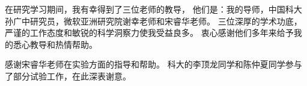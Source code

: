 \begin{acknowledgements}

在研究学习期间，我有幸得到了三位老师的教导，
他们是：我的导师，中国科大孙广中研究员，微软亚洲研究院谢幸老师和宋睿华老师。
三位深厚的学术功底，严谨的工作态度和敏锐的科学洞察力使我受益良多。
衷心感谢他们多年来给予我的悉心教导和热情帮助。

感谢宋睿华老师在实验方面的指导和帮助。
科大的李顶龙同学和陈仲夏同学参与了部分试验工作，在此深表谢意。

\end{acknowledgements}
